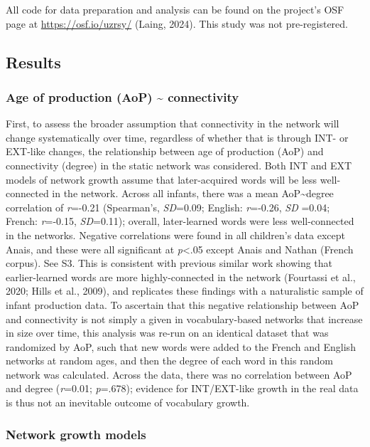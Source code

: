 \documentclass[
  man]{apa6}
\begin{document}
All code for data preparation and analysis can be found on the project's OSF page at \url{https://osf.io/uzrsy/} (Laing, 2024). This study was not pre-registered.

\hypertarget{results}{%
\subsection{Results}\label{results}}

\hypertarget{age-of-production-aop-connectivity}{%
\subsubsection{Age of production (AoP) \textasciitilde{} connectivity}\label{age-of-production-aop-connectivity}}

First, to assess the broader assumption that connectivity in the network will change systematically over time, regardless of whether that is through INT- or EXT-like changes, the relationship between age of production (AoP) and connectivity (degree) in the static network was considered. Both INT and EXT models of network growth assume that later-acquired words will be less well-connected in the network. Across all infants, there was a mean AoP\textasciitilde degree correlation of \emph{r}=-0.21 (Spearman's, \emph{SD}=0.09; English: \emph{r}=-0.26, \emph{SD} =0.04; French: \emph{r}=-0.15, \emph{SD}=0.11); overall, later-learned words were less well-connected in the networks. Negative correlations were found in all children's data except Anais, and these were all significant at \emph{p}\textless.05 except Anais and Nathan (French corpus). See S3. This is consistent with previous similar work showing that earlier-learned words are more highly-connected in the network (Fourtassi et al., 2020; Hills et al., 2009), and replicates these findings with a naturalistic sample of infant production data. To ascertain that this negative relationship between AoP and connectivity is not simply a given in vocabulary-based networks that increase in size over time, this analysis was re-run on an identical dataset that was randomized by AoP, such that new words were added to the French and English networks at random ages, and then the degree of each word in this random network was calculated. Across the data, there was no correlation between AoP and degree (\emph{r}=0.01; \emph{p}=.678); evidence for INT/EXT-like growth in the real data is thus not an inevitable outcome of vocabulary growth.

\hypertarget{network-growth-models-1}{%
\subsubsection{Network growth models}\label{network-growth-models-1}}
\end{document}
